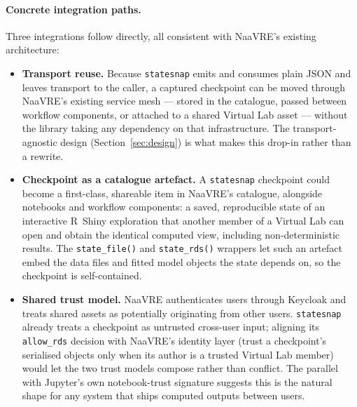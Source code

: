 \documentclass[11pt,a4paper]{article}
\begin{document}
\paragraph{Concrete integration paths.}
Three integrations follow directly, all consistent with NaaVRE's existing
architecture:

\begin{itemize}
  \item \textbf{Transport reuse.} Because \texttt{statesnap} emits and consumes
    plain JSON and leaves transport to the caller, a captured checkpoint can be
    moved through NaaVRE's existing service mesh --- stored in the catalogue,
    passed between workflow components, or attached to a shared Virtual Lab asset
    --- without the library taking any dependency on that infrastructure. The
    transport-agnostic design (Section~\ref{sec:design}) is what makes this
    drop-in rather than a rewrite.
  \item \textbf{Checkpoint as a catalogue artefact.} A \texttt{statesnap}
    checkpoint could become a first-class, shareable item in NaaVRE's catalogue,
    alongside notebooks and workflow components: a saved, reproducible state of
    an interactive R~Shiny exploration that another member of a Virtual Lab can
    open and obtain the identical computed view, including non-deterministic
    results. The \texttt{state\_file()} and \texttt{state\_rds()} wrappers let
    such an artefact embed the data files and fitted model objects the state
    depends on, so the checkpoint is self-contained.
  \item \textbf{Shared trust model.} NaaVRE authenticates users through Keycloak
    and treats shared assets as potentially originating from other users.
    \texttt{statesnap} already treats a checkpoint as untrusted cross-user input;
    aligning its \texttt{allow\_rds} decision with NaaVRE's identity layer (trust
    a checkpoint's serialised objects only when its author is a trusted Virtual
    Lab member) would let the two trust models compose rather than conflict. The
    parallel with Jupyter's own notebook-trust signature suggests this is the
    natural shape for any system that ships computed outputs between users.
\end{itemize}
\end{document}
